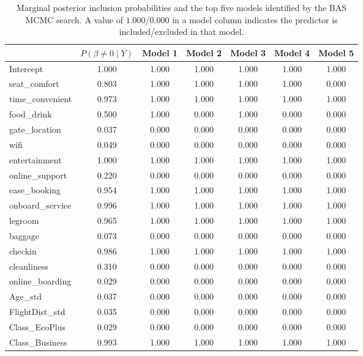 \begin{table}[htbp]
\centering
\footnotesize
\caption{Marginal posterior inclusion probabilities and the top five
models identified by the BAS MCMC search. A value of $1.000$/$0.000$ in a
model column indicates the predictor is included/excluded in that model.}
\label{tab:bas-top}
\begin{tabular}{l S S S S S S}
\toprule
& {$P(\beta\!\neq\!0\mid Y)$} & {Model 1} & {Model 2} & {Model 3} & {Model 4} & {Model 5}\\
\midrule
Intercept            & 1.000 & 1.000 & 1.000 & 1.000 & 1.000 & 1.000\\
seat\_comfort        & 0.803 & 1.000 & 1.000 & 1.000 & 1.000 & 0.000\\
time\_convenient     & 0.973 & 1.000 & 1.000 & 1.000 & 1.000 & 1.000\\
food\_drink          & 0.500 & 1.000 & 0.000 & 1.000 & 0.000 & 0.000\\
gate\_location       & 0.037 & 0.000 & 0.000 & 0.000 & 0.000 & 0.000\\
wifi                 & 0.049 & 0.000 & 0.000 & 0.000 & 0.000 & 0.000\\
entertainment        & 1.000 & 1.000 & 1.000 & 1.000 & 1.000 & 1.000\\
online\_support      & 0.220 & 0.000 & 0.000 & 0.000 & 0.000 & 0.000\\
ease\_booking        & 0.954 & 1.000 & 1.000 & 1.000 & 1.000 & 1.000\\
onboard\_service     & 0.996 & 1.000 & 1.000 & 1.000 & 1.000 & 1.000\\
legroom              & 0.965 & 1.000 & 1.000 & 1.000 & 1.000 & 1.000\\
baggage              & 0.073 & 0.000 & 0.000 & 0.000 & 0.000 & 0.000\\
checkin              & 0.986 & 1.000 & 1.000 & 1.000 & 1.000 & 1.000\\
cleanliness          & 0.310 & 0.000 & 0.000 & 0.000 & 0.000 & 0.000\\
online\_boarding     & 0.029 & 0.000 & 0.000 & 0.000 & 0.000 & 0.000\\
Age\_std             & 0.037 & 0.000 & 0.000 & 0.000 & 0.000 & 0.000\\
FlightDist\_std      & 0.035 & 0.000 & 0.000 & 0.000 & 0.000 & 0.000\\
Class\_EcoPlus       & 0.029 & 0.000 & 0.000 & 0.000 & 0.000 & 0.000\\
Class\_Business      & 0.993 & 1.000 & 1.000 & 1.000 & 1.000 & 1.000\\

\end{tabular}
\end{table}
